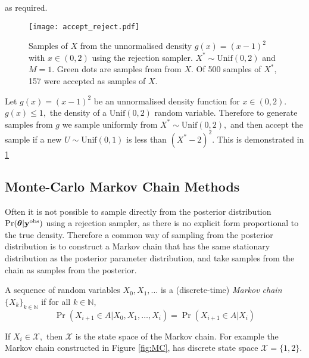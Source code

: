 as required.

\begin{figure}
    \centering
    \texttt{[image: accept\_reject.pdf]}
    \caption{
        Samples of $X$ from the unnormalised density $g(x) = (x - 1)^2$ with
        $x\in(0,2)$ using the rejection sampler. $X^\ast\sim\mathrm{Unif}(0,2)$
        and $M = 1.$
        Green dots are samples from
        from $X.$
        Of 500 samples of $X^\ast$, 157 were accepted as samples of $X$.
    }
    \label{fig:accept_reject}
\end{figure}

\begin{example}
    Let $g(x) = (x - 1)^2$ be an unnormalised density function for
    $x \in (0,2).$ $g(x) \leq 1,$ the density of a $\mathrm{Unif}(0,2)$ random
    variable. Therefore to generate samples from $g$ we sample uniformly from
    $X^\ast \sim \mathrm{Unif}(0, 2),$ and then accept the sample if a new
    $U \sim \mathrm{Unif}(0, 1)$ is less than $(X^\ast - 2)^2.$ This is
    demonstrated in \ref{fig:accept_reject}
\end{example}

\subsection*{Monte-Carlo Markov Chain Methods}

Often it is not possible to sample directly from the posterior distribution
$\Pr(\bm{\theta}|\mathbf{y}^{\mathrm{obs}})$ using a rejection sampler, as there is no
explicit form proportional to the true density.
Therefore a common way of sampling from the posterior distribution is
to construct a Markov chain that has the same stationary distribution as the
posterior parameter distribution, and take samples from the chain as samples
from the posterior.

\begin{definition}
    A sequence of random variables
    $X_0, X_1, \dots$
    is a (discrete-time) \emph{Markov chain} $\{X_k\}_{k\in\mathbb{N}}$ if for
    all
    $k\in\mathbb{N}$,
    $$
        \Pr(X_{i+1}\in A|X_0, X_1, \dots, X_i)
        = \Pr(X_{i+1}\in A|X_i)
    $$
\end{definition}

If $X_i\in\mathcal{X},$ then $\mathcal{X}$ is the state space of the Markov
chain. For example the Markov chain constructed in Figure \ref{fig:MC}, has
discrete state space $\mathcal{X} = \{1, 2\}.$

